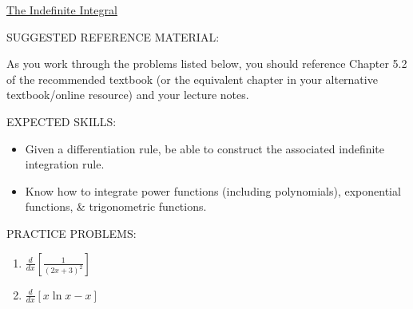 \documentclass[12pt]{article}
\newif\ifans
\begin{document}
\begin{center}
\underline{\LARGE{The Indefinite Integral}}
\end{center}

\noindent SUGGESTED REFERENCE MATERIAL:

\bigskip

\noindent As you work through the problems listed below, you should reference Chapter 5.2 of the recommended textbook (or the equivalent chapter in your alternative textbook/online resource) and your lecture notes.

\bigskip


\noindent EXPECTED SKILLS:

\begin{itemize}

\item Given a differentiation rule, be able to construct the associated indefinite integration rule. 

\item Know how to integrate power functions (including polynomials), exponential functions, \& trigonometric functions.

\end{itemize}

\noindent PRACTICE PROBLEMS:

\medskip


\begin{enumerate}

\item $\frac{d}{dx}\left[\frac{1}{(2x+3)^2}\right]$ 

\ifans{\fbox{$\frac{d}{dx}\left[\frac{1}{(2x+3)^2}\right]=\frac{-4}{(2x+3)^3} \implies \int \frac{-4}{(2x+3)^3} \,dx= \frac{1}{(2x+3)^2}+C$}} \fi

\item $\frac{d}{dx} [x\ln{x}-x]$ 

\ifans{\fbox{$\frac{d}{dx} [x\ln{x}-x]=\ln{x} \implies \int \ln{x} \,dx = x\ln{x}-x+C$}} \fi

\end{enumerate}

\end{document}
